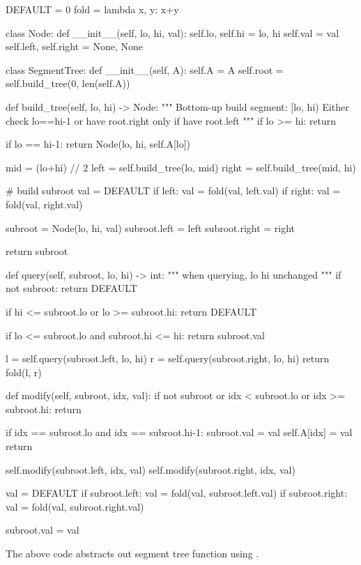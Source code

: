 \begin{python}
DEFAULT = 0
fold = lambda x, y: x+y

class Node:
  def __init__(self, lo, hi, val):
    self.lo, self.hi = lo, hi
    self.val = val
    self.left, self.right = None, None


class SegmentTree:
  def __init__(self, A):
    self.A = A
    self.root = self.build_tree(0, len(self.A))

  def build_tree(self, lo, hi) -> Node:
    """
    Bottom-up build
    segment: [lo, hi)
    Either check lo==hi-1 or have root.right 
    only if have root.left
    """
    if lo >= hi:
      return
    
    if lo == hi-1:
      return Node(lo, hi, self.A[lo])

    mid = (lo+hi) // 2
    left  = self.build_tree(lo, mid)
    right = self.build_tree(mid, hi)

    # build subroot
    val = DEFAULT
    if left:
      val = fold(val, left.val)
    if right:
      val = fold(val, right.val)

    subroot = Node(lo, hi, val)
    subroot.left  = left
    subroot.right = right

    return subroot

  def query(self, subroot, lo, hi) -> int:
    """
    when querying, lo hi unchanged
    """
    if not subroot:
      return DEFAULT
    
    if hi <= subroot.lo or lo >= subroot.hi:
      return DEFAULT

    if lo <= subroot.lo and subroot.hi <= hi:
      return subroot.val

    l = self.query(subroot.left,  lo, hi)
    r = self.query(subroot.right, lo, hi)
    return fold(l, r)

  def modify(self, subroot, idx, val):
    if not subroot or idx < subroot.lo or idx >= subroot.hi:
      return

    if idx == subroot.lo and idx == subroot.hi-1:
      subroot.val = val
      self.A[idx] = val
      return

    self.modify(subroot.left,  idx, val)
    self.modify(subroot.right, idx, val)

    val = DEFAULT
    if subroot.left:
      val = fold(val, subroot.left.val)
    if subroot.right:
      val = fold(val, subroot.right.val)
    
    subroot.val = val
\end{python}
The above code abstracts out segment tree function using . 

